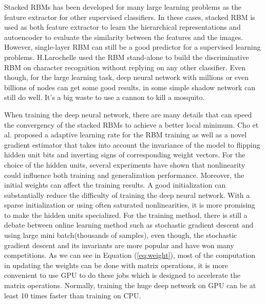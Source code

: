 Stacked RBMs has been developed for many large learning problems as the feature extractor for other supervised classifiers. In these cases, stacked RBM is used as both feature extractor to learn the hierarchical representations and autoencoder to evaluate the similarity between the features and the images.  However, single-layer RBM can still be a good predictor for a supervised learning problems. H.Larochelle used the RBM stand-alone to build the discriminative RBM on character recognition without replying on any other classifier\cite{LarochelleB08}. Even though, for the large learning task, deep neural network with millions or even billions of nodes can get some good results\cite{krizhevsky2012imagenet}\cite{LeRMDCCDN12}, in some simple shadow network can still do well. It's a big waste to use a cannon to kill a mosquito.

When training the deep neural network, there are many details that can speed the convergency of the stacked RBMs to achieve a better local minimum. Cho et al. proposed a adaptive learning rate for the RBM training as well as a novel gradient estimator that takes into account the invariance of the model to flipping hidden unit bits and inverting signs of corresponding weight vectors\cite{cho2011}.  For the choice of the hidden units, several experiments have shown that nonlinearity could influence both training and generalization performance\cite{GlorotB10}\cite{GlorotBB11}\cite{NairH10}. Moreover, the initial weights can affect the training results. A good initialization can substantially reduce the difficulty of training the deep neural network. With a sparse initialization or using often saturated nonlinearities, it is more promising to make the hidden units specialized\cite{martens2010deep}. For the training method, there is still a debate between online learning method such as stochastic gradient descent and using large mini batch(thousands of samples)\cite{LeNCLPN11},  even though, the stochastic gradient descent and its invariants are more popular and have won many competitions. As we can see in Equation (\ref{eq:weight}), most of the computation in updating the weights can be done with matrix operations, it is more convenient to use GPU to do these jobs which is designed to accelerate the matrix operations\cite{raina2009large}. Normally, training the huge deep network on GPU can be at least 10 times faster than training on CPU.

